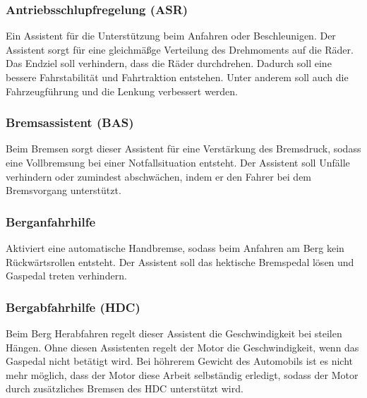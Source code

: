         \subsubsection{Antriebsschlupfregelung (ASR)}
        Ein Assistent für die Unterstützung beim Anfahren oder Beschleunigen. Der
        Assistent sorgt für eine gleichmäßge Verteilung des Drehmoments auf die Räder.
        Das Endziel soll verhindern, dass die Räder durchdrehen. Dadurch soll eine 
        bessere Fahrstabilität und Fahrtraktion entstehen. Unter anderem soll auch 
        die Fahrzeugführung und die Lenkung verbessert werden.
        \cite{assistenzsysteme.PB2} \cite{ASR.PB1} \cite{ASR.PB2} 

        \subsubsection{Bremsassistent (BAS)}
        Beim Bremsen sorgt dieser Assistent für eine Verstärkung des Bremsdruck, sodass
        eine Vollbremsung bei einer Notfallsituation entsteht. Der Assistent soll Unfälle 
        verhindern oder zumindest abschwächen, indem er den Fahrer bei dem Bremsvorgang 
        unterstützt.
        \cite{assistenzsysteme.PB2} \cite{bremsassi.PB1} \cite{bremsassi.PB2}

        \subsubsection{Berganfahrhilfe}
        Aktiviert eine automatische Handbremse, sodass beim Anfahren am Berg kein Rückwärtsrollen
        entsteht. Der Assistent soll das hektische Bremspedal lösen und Gaspedal treten 
        verhindern.
        \cite{berganfahr.PB1} \cite{berganfahr.PB2}  \cite{assistenzsysteme.PB2}
        
        \subsubsection{Bergabfahrhilfe (HDC)}
        Beim Berg Herabfahren regelt dieser Assistent die Geschwindigkeit bei steilen Hängen. 
        Ohne diesen Assistenten regelt der Motor die Geschwindigkeit, wenn das Gaspedal nicht 
        betätigt wird. Bei höhrerem Gewicht des Automobils ist es nicht mehr möglich, dass 
        der Motor diese Arbeit selbständig erledigt, sodass der Motor durch zusätzliches Bremsen 
        des HDC unterstützt wird.
        \cite{assistenzsysteme.PB2} \cite{bergabfahr.PB1} 

